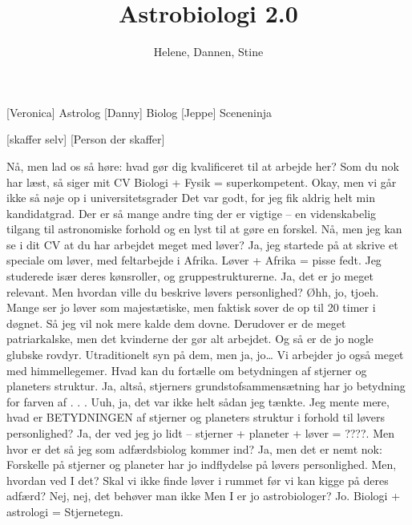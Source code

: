 \documentclass[a4paper,11pt]{article}
\title{Astrobiologi 2.0}
\author{Helene, Dannen, Stine}
\begin{document}
\maketitle

\begin{roles}
	[Veronica] Astrolog
	[Danny] Biolog
	[Jeppe] Sceneninja
\end{roles}

\begin{props}
	[skaffer selv]
	[Person der skaffer]
\end{props}


\begin{sketch}

 Nå, men lad os så høre: hvad gør dig kvalificeret til at arbejde her? 
 Som du nok har læst, så siger mit CV Biologi + Fysik = superkompetent.  
 Okay, men vi går ikke så nøje op i universitetsgrader 
 Det var godt, for jeg fik aldrig helt min kandidatgrad.
 Der er så mange andre ting der er vigtige -- en videnskabelig tilgang til astronomiske forhold og en lyst til at gøre en forskel. Nå, men jeg kan se i dit CV at du har arbejdet meget med løver? 
 Ja, jeg startede på at skrive et speciale om løver, med feltarbejde i Afrika. Løver + Afrika = pisse fedt. Jeg studerede især deres kønsroller, og gruppestrukturerne. 
 Ja, det er jo meget relevant. Men hvordan ville du beskrive løvers personlighed? 
 Øhh, jo, tjoeh. Mange ser jo løver som majestætiske, men faktisk sover de op til 20 timer i døgnet. Så jeg vil nok mere kalde dem dovne. Derudover er de meget patriarkalske, men det kvinderne der gør alt arbejdet. Og så er de jo nogle glubske rovdyr. 
 Utraditionelt syn på dem, men ja, jo… Vi arbejder jo også meget med himmellegemer. Hvad kan du fortælle om betydningen af stjerner og planeters struktur. 
 Ja, altså, stjerners grundstofsammensætning har jo betydning for farven af . . . 
 Uuh, ja, det var ikke helt sådan jeg tænkte. Jeg mente mere, hvad er BETYDNINGEN af stjerner og planeters struktur i forhold til løvers personlighed?
 Ja, der ved jeg jo lidt -- stjerner + planeter + løver = ????. Men hvor er det så jeg som adfærdsbiolog kommer ind?
 Ja, men det er nemt nok: Forskelle på stjerner og planeter har jo indflydelse på løvers personlighed. 
 Men, hvordan ved I det? Skal vi ikke finde løver i rummet før vi kan kigge på deres adfærd?
 Nej, nej, det behøver man ikke
 Men I er jo astrobiologer?
 Jo. Biologi + astrologi = Stjernetegn. 

\end{sketch}
\end{document}
